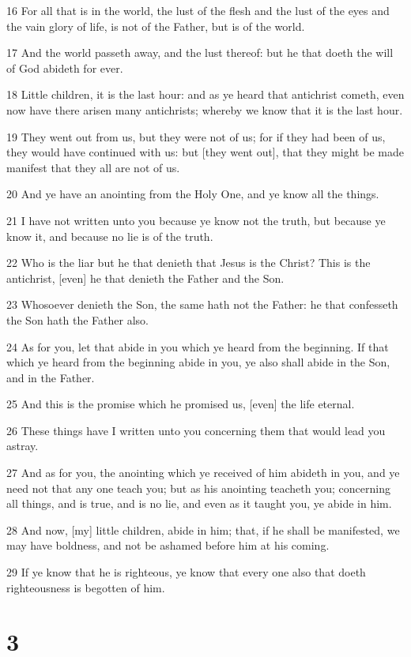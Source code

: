 \par 16 For all that is in the world, the lust of the flesh and the lust of the eyes and the vain glory of life, is not of the Father, but is of the world.
\par 17 And the world passeth away, and the lust thereof: but he that doeth the will of God abideth for ever.
\par 18 Little children, it is the last hour: and as ye heard that antichrist cometh, even now have there arisen many antichrists; whereby we know that it is the last hour.
\par 19 They went out from us, but they were not of us; for if they had been of us, they would have continued with us: but [they went out], that they might be made manifest that they all are not of us.
\par 20 And ye have an anointing from the Holy One, and ye know all the things.
\par 21 I have not written unto you because ye know not the truth, but because ye know it, and because no lie is of the truth.
\par 22 Who is the liar but he that denieth that Jesus is the Christ? This is the antichrist, [even] he that denieth the Father and the Son.
\par 23 Whosoever denieth the Son, the same hath not the Father: he that confesseth the Son hath the Father also.
\par 24 As for you, let that abide in you which ye heard from the beginning. If that which ye heard from the beginning abide in you, ye also shall abide in the Son, and in the Father.
\par 25 And this is the promise which he promised us, [even] the life eternal.
\par 26 These things have I written unto you concerning them that would lead you astray.
\par 27 And as for you, the anointing which ye received of him abideth in you, and ye need not that any one teach you; but as his anointing teacheth you; concerning all things, and is true, and is no lie, and even as it taught you, ye abide in him.
\par 28 And now, [my] little children, abide in him; that, if he shall be manifested, we may have boldness, and not be ashamed before him at his coming.
\par 29 If ye know that he is righteous, ye know that every one also that doeth righteousness is begotten of him.

\chapter{3}

